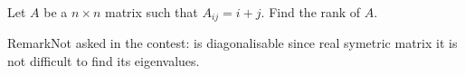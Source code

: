 Let $A$ be a $n\times n$ matrix such that $A_{ij} = i+j$. Find the rank of $A$.

RemarkNot asked in the contest:  is diagonalisable since real symetric matrix it is not difficult to find its eigenvalues.